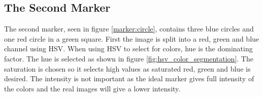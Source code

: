 \subsection{The Second Marker}\label{sec:full_marker2}
The second marker, seen in figure \ref{marker:circle}, contains three blue circles and one red circle in a green square.
First the image is split into a red, green and blue channel using HSV.
When using HSV to select for colors, hue is the dominating factor.
The hue is selected as shown in figure \ref{fig:hsv_color_segmentation}.
The saturation is chosen so it selects high values as saturated red, green and blue is desired.
The intensity is not important as the ideal marker gives full intensity of the colors and the real images will give a lower intensity.

